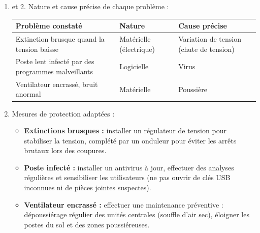 \documentclass[11pt]{article}
\newcommand{\cle}[1]{{\popxbold\color{popdark}#1}}
\begin{document}
\begin{corrige}
\begin{enumerate}
\item et 2. Nature et cause précise de chaque problème :
\begin{center}
\begin{tabularx}{\linewidth}{|X|l|X|}
\hline
\rowcolor{popblueL} \textbf{Problème constaté} & \textbf{Nature} & \textbf{Cause précise} \\
\hline
Extinction brusque quand la tension baisse & Matérielle (électrique) & Variation de tension (chute de tension) \\
\hline
Poste lent infecté par des programmes malveillants & Logicielle & Virus \\
\hline
Ventilateur encrassé, bruit anormal & Matérielle & Poussière \\
\hline
\end{tabularx}
\end{center}
\item Mesures de protection adaptées :
\begin{itemize}
\item \textbf{Extinctions brusques :} installer un \cle{régulateur de tension} pour stabiliser la tension, complété par un \cle{onduleur} pour éviter les arrêts brutaux lors des coupures.
\item \textbf{Poste infecté :} installer un \cle{antivirus} à jour, effectuer des analyses régulières et sensibiliser les utilisateurs (ne pas ouvrir de clés USB inconnues ni de pièces jointes suspectes).
\item \textbf{Ventilateur encrassé :} effectuer une \cle{maintenance préventive} : dépoussiérage régulier des unités centrales (souffle d'air sec), éloigner les postes du sol et des zones poussiéreuses.
\end{itemize}
\end{enumerate}
\end{corrige}
\end{document}
